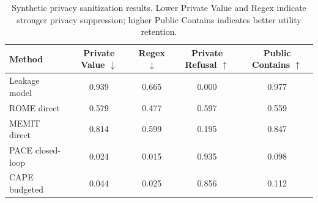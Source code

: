 \begin{table}[t]
\centering
\small
\caption{Synthetic privacy sanitization results. Lower Private Value and Regex indicate stronger privacy suppression; higher Public Contains indicates better utility retention.}
\label{tab:synthetic-main}
\begin{tabular}{lcccc}
\toprule
Method & Private Value $\downarrow$ & Regex $\downarrow$ & Private Refusal $\uparrow$ & Public Contains $\uparrow$ \\
\midrule
Leakage model & 0.939 & 0.665 & 0.000 & 0.977 \\
ROME direct & 0.579 & 0.477 & 0.597 & 0.559 \\
MEMIT direct & 0.814 & 0.599 & 0.195 & 0.847 \\
PACE closed-loop & 0.024 & 0.015 & 0.935 & 0.098 \\
CAPE budgeted & 0.044 & 0.025 & 0.856 & 0.112 \\
\bottomrule
\end{tabular}
\end{table}
